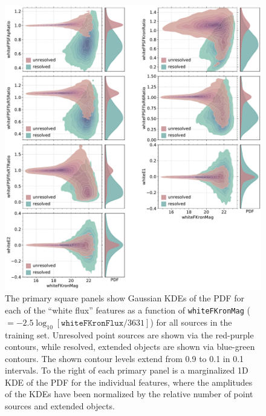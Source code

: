 \documentclass[twocolumn]{aastex63}
\begin{document}
\begin{figure}
    \centering
    \includegraphics[width=6.5in]{./figures/whiteFeatures.pdf}
    \caption{The primary square panels show Gaussian KDEs of the PDF for each
    of the ``white flux'' features as a function of \texttt{whiteFKronMag}
    ($=-2.5\log_{10}[\mathtt{whiteFKronFlux}/3631]$) for all sources in the
    training set. Unresolved point sources are shown via the red-purple
    contours, while resolved, extended objects are shown via blue-green
    contours. The shown contour levels extend from 0.9 to 0.1 in 0.1
    intervals. To the right of each primary panel is a marginalized 1D KDE of
    the PDF for the individual features, where the amplitudes of the KDEs have
    been normalized by the relative number of point sources and extended
    objects.}
    \label{fig:features}
\end{figure} 
\end{document}
